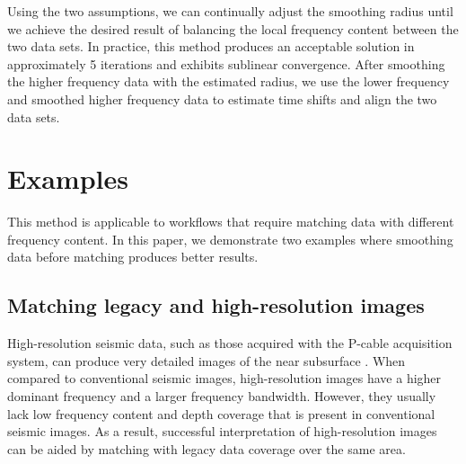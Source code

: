         Using the two assumptions, we can continually adjust the smoothing radius until we 
        achieve the desired result of balancing the local frequency content between the two data
        sets. In practice, this method produces an acceptable solution in approximately 5 iterations
        and exhibits sublinear convergence. After smoothing the higher frequency data with the
        estimated radius, we use the lower frequency and smoothed higher frequency data to estimate
        time shifts and align the two data sets.
        
\section{Examples}
        This method is applicable to workflows that require matching data with different frequency
        content. In this paper, we demonstrate two examples where smoothing data before matching
        produces better results.
        
        \subsection{Matching legacy and high-resolution images}
        High-resolution seismic data, such as those acquired with the P-cable acquisition system,
        can produce very detailed images of the near subsurface \cite[]{tip}. When compared to
        conventional seismic images, high-resolution images have a higher dominant frequency and a
        larger frequency bandwidth. However, they usually lack low frequency content and depth
        coverage that is present in conventional seismic images. As a result, successful
        interpretation of high-resolution images can be aided by matching with legacy data coverage
        over the same area.



